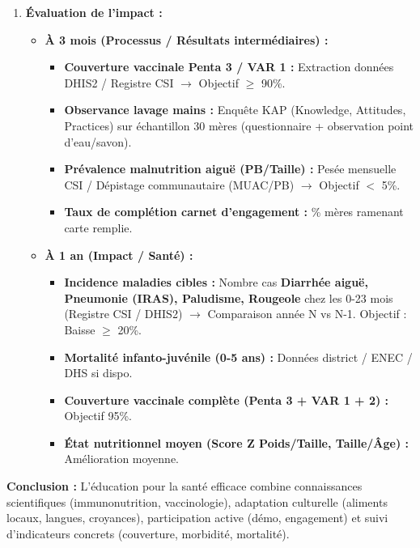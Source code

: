 \documentclass[11pt]{article}
\begin{document}
\begin{exoresolu}
\begin{enumerate}
        \item \textbf{Évaluation de l'impact :}
        \begin{itemize}
            \item \textbf{À 3 mois (Processus / Résultats intermédiaires) :}
                \begin{itemize}
                    \item \textbf{Couverture vaccinale Penta 3 / VAR 1 :} Extraction données DHIS2 / Registre CSI $\rightarrow$ Objectif $\geq$ 90\%.
                    \item \textbf{Observance lavage mains :} Enquête KAP (Knowledge, Attitudes, Practices) sur échantillon 30 mères (questionnaire + observation point d'eau/savon).
                    \item \textbf{Prévalence malnutrition aiguë (PB/Taille) :} Pesée mensuelle CSI / Dépistage communautaire (MUAC/PB) $\rightarrow$ Objectif $<$ 5\%.
                    \item \textbf{Taux de complétion carnet d'engagement :} \% mères ramenant carte remplie.
                \end{itemize}
            \item \textbf{À 1 an (Impact / Santé) :}
                \begin{itemize}
                    \item \textbf{Incidence maladies cibles :} Nombre cas \textbf{Diarrhée aiguë, Pneumonie (IRAS), Paludisme, Rougeole} chez les 0-23 mois (Registre CSI / DHIS2) $\rightarrow$ Comparaison année N vs N-1. Objectif : Baisse $\geq$ 20\%.
                    \item \textbf{Mortalité infanto-juvénile (0-5 ans) :} Données district / ENEC / DHS si dispo.
                    \item \textbf{Couverture vaccinale complète (Penta 3 + VAR 1 + 2) :} Objectif 95\%.
                    \item \textbf{État nutritionnel moyen (Score Z Poids/Taille, Taille/Âge) :} Amélioration moyenne.
                \end{itemize}
        \end{itemize}
    \end{enumerate}
    \textbf{Conclusion :} L'éducation pour la santé efficace combine connaissances scientifiques (immunonutrition, vaccinologie), adaptation culturelle (aliments locaux, langues, croyances), participation active (démo, engagement) et suivi d'indicateurs concrets (couverture, morbidité, mortalité).
\end{exoresolu}
\end{document}
